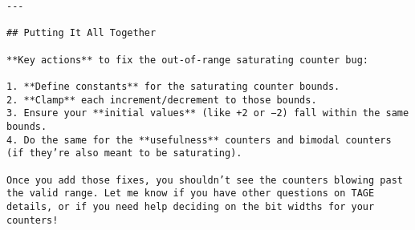 \documentclass[11pt]{article}
\begin{document}
\begin{Verbatim}[fontsize=\tiny, breaklines=true]
---

## Putting It All Together

**Key actions** to fix the out-of-range saturating counter bug:

1. **Define constants** for the saturating counter bounds.
2. **Clamp** each increment/decrement to those bounds.
3. Ensure your **initial values** (like +2 or −2) fall within the same bounds.
4. Do the same for the **usefulness** counters and bimodal counters (if they’re also meant to be saturating).

Once you add those fixes, you shouldn’t see the counters blowing past the valid range. Let me know if you have other questions on TAGE details, or if you need help deciding on the bit widths for your counters!
\end{Verbatim}
\end{document}
